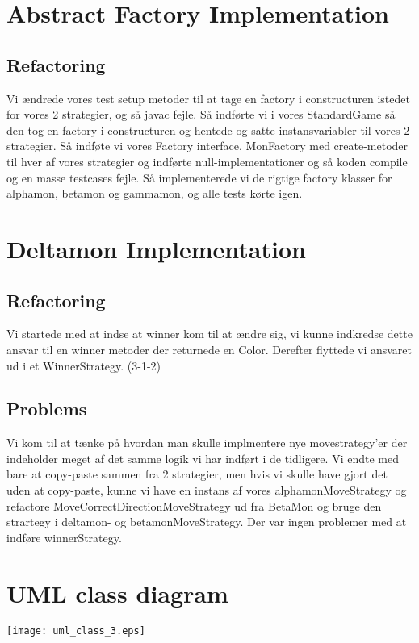\documentclass[a4paper]{article}
\begin{document}
\lhead{}
\rhead{}


\section{Abstract Factory Implementation}
\subsection{Refactoring}
Vi ændrede vores test setup metoder til at tage en factory i constructuren
istedet for vores 2 strategier, og så javac fejle.
Så indførte vi i vores StandardGame så den tog en factory i constructuren
og hentede og satte instansvariabler til vores 2 strategier.
Så indføte vi vores Factory interface, MonFactory med create-metoder til
hver af vores strategier og indførte null-implementationer og så koden
compile og en masse testcases fejle.
Så implementerede vi de rigtige factory klasser for alphamon, betamon og 
gammamon, og alle tests kørte igen.

\section{Deltamon Implementation}
\subsection{Refactoring}
Vi startede med at indse at winner kom til at ændre sig, vi kunne indkredse
dette ansvar til en winner metoder der returnede en Color. Derefter flyttede
vi ansvaret ud i et WinnerStrategy. (3-1-2)
\subsection{Problems}
Vi kom til at tænke på hvordan man skulle implmentere nye movestrategy'er der
indeholder meget af det samme logik vi har indført i de tidligere. Vi endte
med bare at copy-paste sammen fra 2 strategier, men hvis vi skulle have gjort
det uden at copy-paste, kunne vi have en instans af vores alphamonMoveStrategy
og refactore MoveCorrectDirectionMoveStrategy ud fra BetaMon og bruge den
strartegy i deltamon- og betamonMoveStrategy.
Der var ingen problemer med at indføre winnerStrategy.

\section{UML class diagram}
\texttt{[image: uml\_class\_3.eps]}
\end{document}
